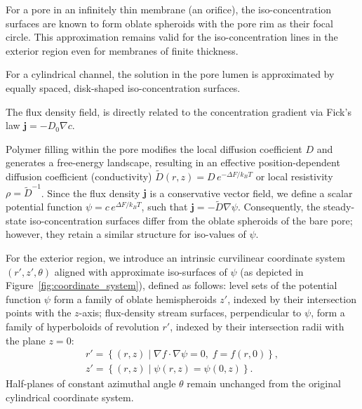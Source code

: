\documentclass[10pt, a4paper, twocolumn]{article}
\begin{document}
For a pore in an infinitely thin membrane (an orifice), the iso-concentration surfaces are known to form oblate spheroids with the pore rim as their focal circle.
This approximation remains valid for the iso-concentration lines in the exterior region even for membranes of finite thickness.

For a cylindrical channel, the solution in the pore lumen is approximated by equally spaced, disk-shaped iso-concentration surfaces. 

The flux density field, is directly related to the concentration gradient via Fick's law \mbox{$\bm{j} = -D_0 \nabla c$}.

Polymer filling within the pore modifies the local diffusion coefficient $D$ and generates a free-energy landscape, resulting in an effective position-dependent diffusion coefficient (conductivity) $\tilde{D}(r,z) = D\,e^{-\Delta F/k_B T}$ or local resistivity $\rho = \tilde{D}^{-1}$.
Since the flux density $\bm{j}$ is a conservative vector field, we define a scalar potential function $\psi = c\,e^{\Delta F/k_B T}$, such that $\bm{j} = -\tilde{D}\nabla\psi$.
Consequently, the steady-state iso-concentration surfaces differ from the oblate spheroids of the bare pore; however, they retain a similar structure for iso-values of $\psi$.

For the exterior region, we introduce an intrinsic curvilinear coordinate system $(r', z', \theta)$ aligned with approximate iso-surfaces of \(\psi\) (as depicted in Figure~\ref{fig:coordinate_system}), defined as follows:
level sets of the potential function $\psi$ form a family of oblate hemispheroids $z'$, indexed by their intersection points with the $z$-axis;
flux-density stream surfaces, perpendicular to $\psi$, form a family of hyperboloids of revolution $r'$, indexed by their intersection radii with the plane $z=0$:
\begin{gather}
    r' = \left\{(r,z) \mid \nabla f \cdot \nabla \psi = 0,\; f=f(r,0)\right\},
    \\
    z' = \left\{(r,z) \mid \psi(r,z)=\psi(0,z)\right\}.
\end{gather}
Half-planes of constant azimuthal angle \(\theta\) remain unchanged from the original cylindrical coordinate system.
\end{document}
